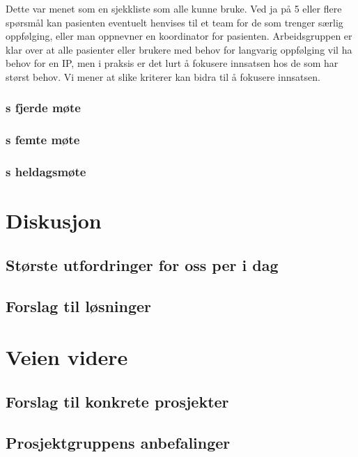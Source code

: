 \documentclass[11pt]{report} %
\begin{document}
                    Dette var menet som en sjekkliste som alle kunne bruke. Ved ja på 5 eller flere spørsmål kan pasienten eventuelt henvises til et team for de som trenger særlig oppfølging, eller man oppnevner en koordinator for pasienten. Arbeidsgruppen er klar over at alle pasienter eller brukere med behov for langvarig oppfølging vil ha behov for en IP, men i praksis er det lurt å fokusere innsatsen hos de som har størst behov. Vi mener at slike kriterer kan bidra til å fokusere innsatsen.\\
                  \subsection{s fjerde møte}\label{sec:agr_4}
                  \subsection{s femte møte}\label{sec:agr_5}
                  \subsection{s heldagsmøte}\label{sec:agr_6}
                    

              \chapter{Diskusjon}\label{chap:disk}
                \section{Største utfordringer for oss per i dag} \label{chap:disk_utf}

                \section{Forslag til løsninger}\label{chap:disk_losn}

              \chapter{Veien videre}\label{chap:vvidere}
                \section{Forslag til konkrete prosjekter}\label{chap:vvidere_konkpr}
                \section{Prosjektgruppens anbefalinger}\label{chap:vvidere_anbef}
\end{document}
